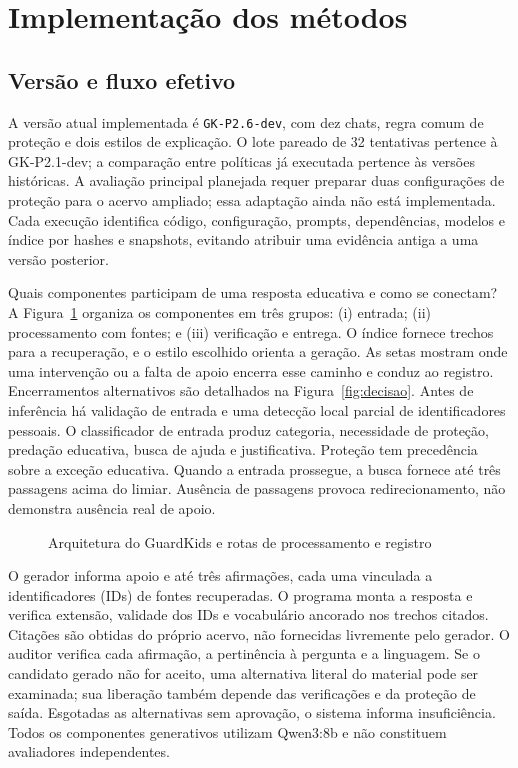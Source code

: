 \section{Implementação dos métodos}\label{cap:artefato}

\subsection{Versão e fluxo efetivo}

A versão atual implementada é \texttt{GK-P2.6-dev}, com dez chats, regra comum de proteção e dois estilos de explicação. O lote pareado de 32 tentativas pertence à GK-P2.1-dev; a comparação entre políticas já executada pertence às versões históricas. A avaliação principal planejada requer preparar duas configurações de proteção para o acervo ampliado; essa adaptação ainda não está implementada. Cada execução identifica código, configuração, prompts, dependências, modelos e índice por hashes e snapshots, evitando atribuir uma evidência antiga a uma versão posterior.

Quais componentes participam de uma resposta educativa e como se conectam? A Figura~\ref{fig:arquitetura} organiza os componentes em três grupos: (i) entrada; (ii) processamento com fontes; e (iii) verificação e entrega. O índice fornece trechos para a recuperação, e o estilo escolhido orienta a geração. As setas mostram onde uma intervenção ou a falta de apoio encerra esse caminho e conduz ao registro. Encerramentos alternativos são detalhados na Figura~\ref{fig:decisao}. Antes de inferência há validação de entrada e uma detecção local parcial de identificadores pessoais. O classificador de entrada produz categoria, necessidade de proteção, predação educativa, busca de ajuda e justificativa. Proteção tem precedência sobre a exceção educativa. Quando a entrada prossegue, a busca fornece até três passagens acima do limiar. Ausência de passagens provoca redirecionamento, não demonstra ausência real de apoio.

\begin{figure}[htbp]\centering
\caption{Arquitetura do GuardKids e rotas de processamento e registro}\label{fig:arquitetura}

\end{figure}

O gerador informa apoio e até três afirmações, cada uma vinculada a identificadores (IDs) de fontes recuperadas. O programa monta a resposta e verifica extensão, validade dos IDs e vocabulário ancorado nos trechos citados. Citações são obtidas do próprio acervo, não fornecidas livremente pelo gerador. O auditor verifica cada afirmação, a pertinência à pergunta e a linguagem. Se o candidato gerado não for aceito, uma alternativa literal do material pode ser examinada; sua liberação também depende das verificações e da proteção de saída. Esgotadas as alternativas sem aprovação, o sistema informa insuficiência. Todos os componentes generativos utilizam Qwen3:8b e não constituem avaliadores independentes.

